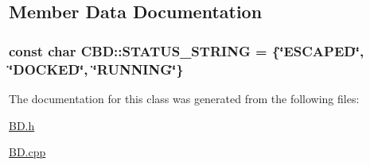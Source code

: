 \subsection{Member Data Documentation}
\hypertarget{classCBD_a20beab0b7b100a3d5baf2b3924453641}{
\subsubsection[{S\-T\-A\-T\-U\-S\-\_\-\-S\-T\-R\-I\-N\-G}]{\setlength{\rightskip}{0pt plus 5cm}const char C\-B\-D\-::\-S\-T\-A\-T\-U\-S\-\_\-\-S\-T\-R\-I\-N\-G = \{\char`\"{}E\-S\-C\-A\-P\-E\-D\char`\"{}, \char`\"{}{\bf D\-O\-C\-K\-E\-D}\char`\"{}, \char`\"{}{\bf R\-U\-N\-N\-I\-N\-G}\char`\"{}\}\hspace{0.3cm}{\ttfamily [static]}}}\label{classCBD_a20beab0b7b100a3d5baf2b3924453641}


The documentation for this class was generated from the following files\-:\begin{DoxyCompactItemize}
\item 
\hyperlink{BD_8h}{B\-D.\-h}\item 
\hyperlink{BD_8cpp}{B\-D.\-cpp}\end{DoxyCompactItemize}
